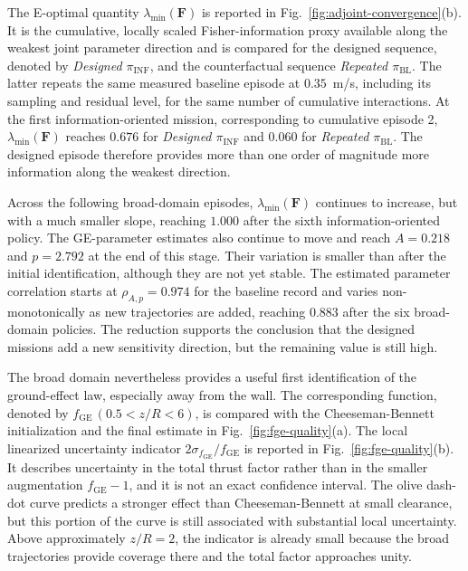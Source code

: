 \documentclass[journal]{IEEEtran}
\begin{document}
The E-optimal quantity $\lambda_{\min}(\mathbf F)$ is reported in Fig.~\ref{fig:adjoint-convergence}(b). It is the cumulative, locally scaled Fisher-information proxy available along the weakest joint parameter direction and is compared for the designed sequence, denoted by \emph{Designed $\pi_{\mathrm{INF}}$}, and the counterfactual sequence \emph{Repeated $\pi_{\mathrm{BL}}$}. The latter repeats the same measured baseline episode at $0.35$~m/s, including its sampling and residual level, for the same number of cumulative interactions. At the first information-oriented mission, corresponding to cumulative episode 2, $\lambda_{\min}(\mathbf F)$ reaches $0.676$ for \emph{Designed $\pi_{\mathrm{INF}}$} and $0.060$ for \emph{Repeated $\pi_{\mathrm{BL}}$}. The designed episode therefore provides more than one order of magnitude more information along the weakest direction.

Across the following broad-domain episodes, $\lambda_{\min}(\mathbf F)$ continues to increase, but with a much smaller slope, reaching $1.000$ after the sixth information-oriented policy. The GE-parameter estimates also continue to move and reach $A=0.218$ and $p=2.792$ at the end of this stage. Their variation is smaller than after the initial identification, although they are not yet stable. The estimated parameter correlation starts at $\rho_{A,p}=0.974$ for the baseline record and varies non-monotonically as new trajectories are added, reaching $0.883$ after the six broad-domain policies. The reduction supports the conclusion that the designed missions add a new sensitivity direction, but the remaining value is still high.

The broad domain nevertheless provides a useful first identification of the ground-effect law, especially away from the wall. The corresponding function, denoted by $f_{\mathrm{GE}}\,(0.5<z/R<6)$, is compared with the Cheeseman-Bennett initialization and the final estimate in Fig.~\ref{fig:fge-quality}(a). The local linearized uncertainty indicator $2\sigma_{f_{\mathrm{GE}}}/f_{\mathrm{GE}}$ is reported in Fig.~\ref{fig:fge-quality}(b). It describes uncertainty in the total thrust factor rather than in the smaller augmentation $f_{\mathrm{GE}}-1$, and it is not an exact confidence interval. The olive dash-dot curve predicts a stronger effect than Cheeseman-Bennett at small clearance, but this portion of the curve is still associated with substantial local uncertainty. Above approximately $z/R=2$, the indicator is already small because the broad trajectories provide coverage there and the total factor approaches unity.
\end{document}
